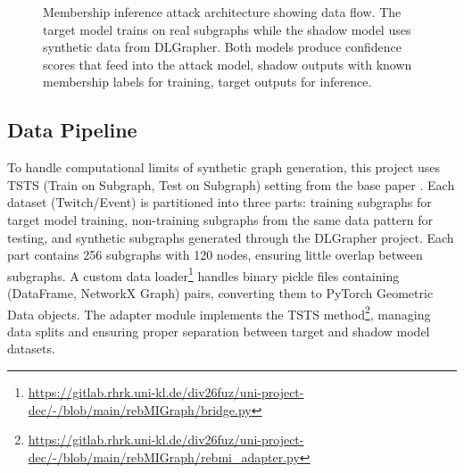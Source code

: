 \documentclass{article}
\begin{document}
\begin{figure}[H]
\caption{Membership inference attack architecture showing data flow. The target model trains on real subgraphs while the shadow model uses synthetic data from DLGrapher. Both models produce confidence scores that feed into the attack model, shadow outputs with known membership labels for training, target outputs for inference.}
\label{fig:attack-architecture}
\end{figure}

\subsection{Data Pipeline}
To handle computational limits of synthetic graph generation, this project uses TSTS (Train on Subgraph, Test on Subgraph) setting from the base paper \cite{olatunji2021membershipinferenceattackgraph}. Each dataset (Twitch/Event) is partitioned into three parts: training subgraphs for target model training, non-training subgraphs from the same data pattern for testing, and synthetic subgraphs generated through the DLGrapher project\cite{lan2024dlgrapher}. Each part contains 256 subgraphs with 120 nodes, ensuring little overlap between subgraphs. A custom data loader\footnote{\url{https://gitlab.rhrk.uni-kl.de/div26fuz/uni-project-dec/-/blob/main/rebMIGraph/bridge.py}} handles binary pickle files containing (DataFrame, NetworkX Graph) pairs, converting them to PyTorch Geometric Data objects. The adapter module implements the TSTS method\footnote{\url{https://gitlab.rhrk.uni-kl.de/div26fuz/uni-project-dec/-/blob/main/rebMIGraph/rebmi_adapter.py}}, managing data splits and ensuring proper separation between target and shadow model datasets.
\end{document}
